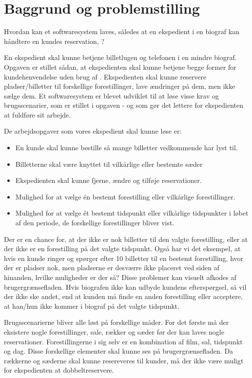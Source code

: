 \chapter{Baggrund og problemstilling}

Hvordan kan et softwaresystem laves, således at en ekspedient i en biograf kan håndtere en kundes reservation, ?


En ekspedient skal kunne betjene billetlugen og telefonen i en mindre biograf. Opgaven er stillet sådan, at ekspedienten skal kunne betjene begge former for kundehenvendelse uden brug af . Ekspedienten skal kunne reservere pladser/billetter til forskellige forestillinger, lave ændringer på dem, men ikke sælge dem. Et softwaresystem er blevet udviklet til at løse visse krav og brugsscenarier, som er stillet i opgaven - og som gør det lettere for ekspedienten at fuldføre sit arbejde.

De arbejdsopgaver som vores ekspedient skal kunne løse er:
\begin{itemize}
  \item En kunde skal kunne bestille så mange billetter vedkommende har lyst til.
  \item Billetterne skal være knyttet til vilkårlige eller bestemte sæder
  \item Ekspedienten skal kunne fjerne, ændre og tilføje reservationer.
  \item Mulighed for at vælge én bestemt forestilling eller vilkårlige forestillinger.
  \item Mulighed for at vælge ét bestemt tidspunkt eller vilkårlige tidspunkter i løbet af den periode, de forskellige forestillinger bliver vist.
\end{itemize}

Der er en chance for, at der ikke er nok billetter til den valgte forestilling, eller at der ikke er en forestilling på det valgte tidspunkt. Også har vi det eksempel, at hvis en kunde ringer og spørger efter 10 billetter til en bestemt forestilling, hvor der er pladser nok, men pladserne er desværre ikke placeret ved siden af hinanden, hvilke muligheder er der så? Disse problemer kan visuelt afkodes af brugergrænsefladen. Hvis biografen ikke kan udbyde kundens efterspørgsel, så vil der ikke ske andet, end at kunden må finde en anden forestilling eller acceptere, at han/hun ikke kommer i biograf på det valgte tidspunkt.

Brugsscenarierne bliver alle løst på forskellige måder. For det første må der eksistere nogle forestillinger, sale, rækker og sæder før der kan laves nogle reservationer. Forestillingerne i sig selv er en kombination af film, sal, tidspunkt og dag. Disse forskellige elementer skal kunne ses på brugergrænsefladen. Da rækkerne og sæderne skal kunne resereveres til kunder, må der ikke være muligt for ekspedienten at dobbeltreservere.

